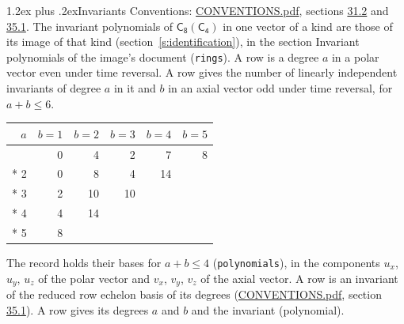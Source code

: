 \documentclass[10pt,a4paper]{article}
\makeatletter
\renewcommand\section{\@startsection{section}{1}{\z@}{-3ex plus -1ex minus -.2ex}%
  {1.2ex plus .2ex}{\normalfont\large\sffamily\bfseries\color{parttitle}}}
\numberwithin{equation}{section}
\newcommand{\grp}[1]{\mathsf{#1}}
\makeatother
\begin{document}
\section{Invariants}\label{s:invariants}
Conventions: \href{../../CONVENTIONS.pdf}{CONVENTIONS.pdf}, sections \href{../../CONVENTIONS.pdf\#conv.31.2}{31.2} and \href{../../CONVENTIONS.pdf\#conv.35.1}{35.1}.
The invariant polynomials of $\grp{C_{8}}(\grp{C_{4}})$ in one vector of a kind are those of its image of that kind (section~\ref{s:identification}), in the section Invariant polynomials of the image's document (\texttt{rings}).
\leavevmode\label{n:index.degree.polar}\label{n:index.degree.axial}A row is a degree $a$ in a polar vector even under time reversal. A row gives the number of linearly independent invariants of degree $a$ in it and $b$ in an axial vector odd under time reversal, for $a + b \le 6$.
{\small\begin{longtable}{@{}rrrrrr@{}}\toprule
$a$ & $b = 1$ & $b = 2$ & $b = 3$ & $b = 4$ & $b = 5$\\\midrule\endhead
\bottomrule\endfoot\endlastfoot
1 & 0 & 4 & 2 & 7 & 8\\*
2 & 0 & 8 & 4 & 14 & \\*
3 & 2 & 10 & 10 &  & \\*
4 & 4 & 14 &  &  & \\*
5 & 8 &  &  &  & \\
\bottomrule\end{longtable}}
\leavevmode\label{n:local.component.polar}\label{n:local.component.axial}The record holds their bases for $a + b \le 4$ (\texttt{polynomials}), in the components $u_{x}$, $u_{y}$, $u_{z}$ of the polar vector and $v_{x}$, $v_{y}$, $v_{z}$ of the axial vector. \label{n:head.polynomial}A row is an invariant of the reduced row echelon basis of its degrees (\href{../../CONVENTIONS.pdf}{CONVENTIONS.pdf}, section \href{../../CONVENTIONS.pdf\#conv.35.1}{35.1}). A row gives its degrees $a$ and $b$ and the invariant (polynomial).
\end{document}
